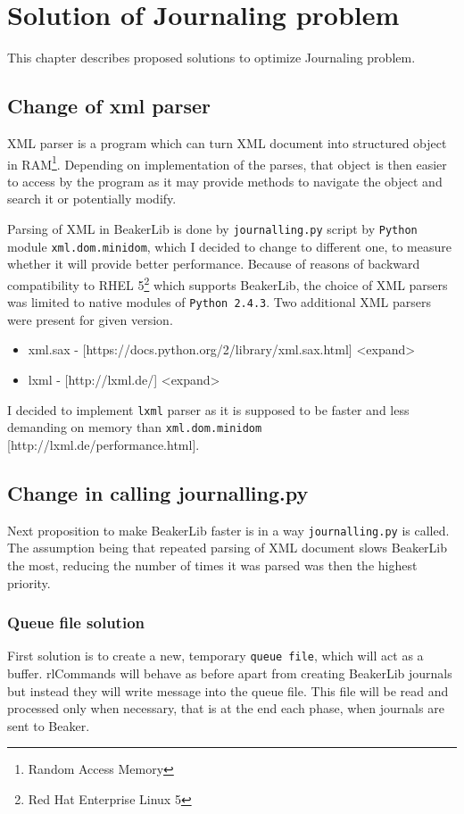 \chapter{Solution of Journaling problem}
This chapter describes proposed solutions to optimize Journaling problem.

\section{Change of xml parser}
XML parser is a program which can turn XML document into structured object in RAM\footnote{Random Access Memory}. Depending on implementation of the parses, that object is then easier to access by the program as it may provide methods to navigate the object and search it or potentially modify. 

Parsing of XML in BeakerLib is done by \texttt{journalling.py} script by \texttt{Python} module \texttt{xml.dom.minidom}, which I decided to change to different one, to measure whether it will provide better performance. Because of reasons of backward compatibility to RHEL 5\footnote{Red Hat Enterprise Linux 5} which supports BeakerLib, the choice of XML parsers was limited to native modules of \texttt{Python 2.4.3}. Two additional XML parsers were present for given version.

\begin{itemize}
\item xml.sax -  [https://docs.python.org/2/library/xml.sax.html] <expand>
\item lxml - [http://lxml.de/] <expand>
\end{itemize}

I decided to implement \texttt{lxml} parser as it is supposed to be faster and less demanding on memory than \texttt{xml.dom.minidom} [http://lxml.de/performance.html].

\section{Change in calling journalling.py}
Next proposition to make BeakerLib faster is in a way \texttt{journalling.py} is called. The assumption being that repeated parsing of XML document slows BeakerLib the most, reducing the number of times it was parsed was then the highest priority. 

\subsection{Queue file solution}
First solution is to create a new, temporary \texttt{queue file}, which will act as a buffer. rlCommands will behave as before apart from creating BeakerLib journals but instead they will write message into the queue file. This file will be read and processed only when necessary, that is at the end each phase, when journals are sent to Beaker.

